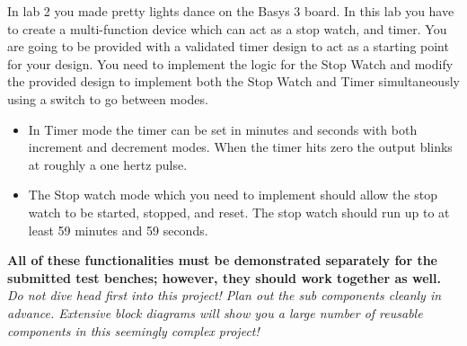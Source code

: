 In lab 2 you made pretty lights dance on the Basys 3 board. In this lab you have to create a multi-function device which can act as a stop watch, and timer. You are going to be provided with a validated timer design to act as a starting point for your design. You need to implement the logic for the Stop Watch and modify the provided design to implement both the Stop Watch and Timer simultaneously using a switch to go between modes.\\
\begin{itemize}
    \item In Timer mode the timer can be set in minutes and seconds with both increment and decrement modes. When the timer hits zero the output blinks at roughly a one hertz pulse. 
    \item The Stop watch mode which you need to implement should allow the stop watch to be started, stopped, and reset. The stop watch should run up to at least 59 minutes and 59 seconds.
\end{itemize}

\textbf{All of these functionalities must be demonstrated separately for the submitted test benches; however, they should work together as well. \\}
\vspace{1cm}
\textit{Do not dive head first into this project! Plan out the sub components cleanly in advance. Extensive block diagrams will show you a large number of reusable components in this seemingly complex project!}